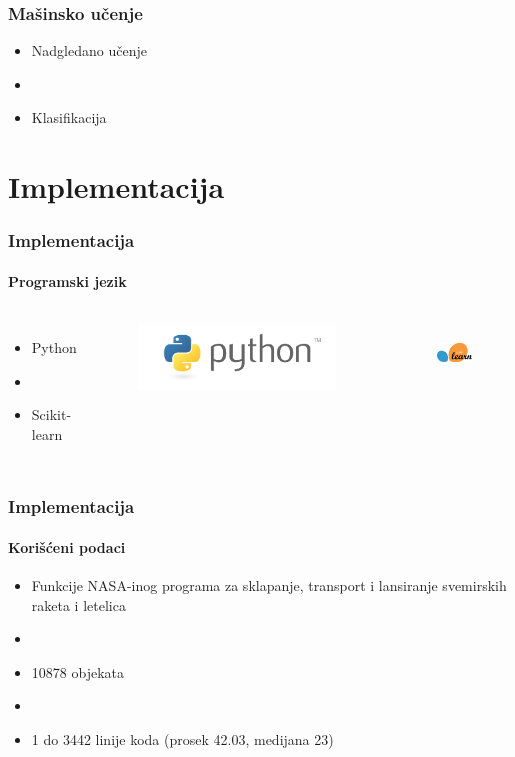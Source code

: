 \documentclass[14pt]{beamer}
\begin{document}
\begin{frame}
\frametitle{Mašinsko učenje}

\begin{itemize}
\item Nadgledano učenje
\item[]
\item Klasifikacija
\end{itemize}

\end{frame}


\section{Implementacija}
%
%
%


\begin{frame}
\frametitle{Implementacija}
\framesubtitle{Programski jezik}

\begin{columns}[c]

\begin{itemize}
\item Python
\item[]
\item Scikit-learn
\end{itemize}

\begin{figure}
\includegraphics[width=0.6\linewidth]{python}
\end{figure}

\begin{figure}
\includegraphics[width=0.6\linewidth, height=1.5cm]{sklearn}
\end{figure}

\end{columns}

\end{frame}

\begin{frame}
\frametitle{Implementacija}
\framesubtitle{Korišćeni podaci}

\begin{itemize}
\item Funkcije NASA-inog programa za sklapanje, transport i lansiranje svemirskih raketa i letelica
\item[]
\item 10878 objekata
\item[]
\item 1 do 3442 linije koda (prosek 42.03, medijana 23)
\end{itemize}

\end{frame}
\end{document}
